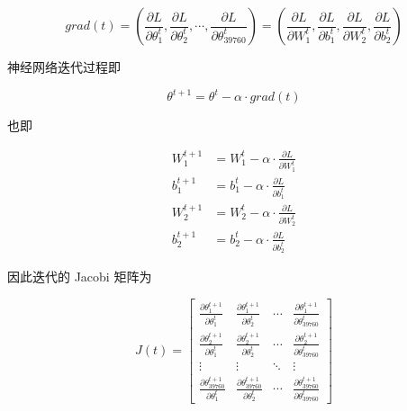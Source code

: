 \documentclass[12pt,a4paper]{amsart}
\begin{document}
\begin{equation}
	grad(t) = (\frac{\partial L}{\partial \theta_1^t}, \frac{\partial L}{\partial \theta_2^t}, \cdots, \frac{\partial L}{\partial \theta_{39760}^t}) = (\frac{\partial L}{\partial W_1^t}, \frac{\partial L}{\partial b_1^t}, \frac{\partial L}{\partial W_2^t}, \frac{\partial L}{\partial b_2^t})
\end{equation}


神经网络迭代过程即

\begin{equation}
	\theta^{t+1} = \theta^t - \alpha \cdot grad(t)
\end{equation}

也即

\begin{equation}
	\begin{aligned}
		W_1^{t+1} & = W_1^t - \alpha \cdot \frac{\partial L}{\partial W_1^t} \\
		b_1^{t+1} & = b_1^t - \alpha \cdot \frac{\partial L}{\partial b_1^t} \\
		W_2^{t+1} & = W_2^t - \alpha \cdot \frac{\partial L}{\partial W_2^t} \\
		b_2^{t+1} & = b_2^t - \alpha \cdot \frac{\partial L}{\partial b_2^t}
	\end{aligned}
\end{equation}

因此迭代的 Jacobi 矩阵为

\begin{equation}
	J(t) = \begin{bmatrix}
		\frac{\partial \theta_1^{t+1}}{\partial \theta_1^t} & \frac{\partial \theta_1^{t+1}}{\partial \theta_2^t} & \cdots & \frac{\partial \theta_1^{t+1}}{\partial \theta_{39760}^t} \\
		\frac{\partial \theta_2^{t+1}}{\partial \theta_1^t} & \frac{\partial \theta_2^{t+1}}{\partial \theta_2^t} & \cdots & \frac{\partial \theta_2^{t+1}}{\partial \theta_{39760}^t} \\
		\vdots                                              & \vdots                                              & \ddots & \vdots                                              \\
		\frac{\partial \theta_{39760}^{t+1}}{\partial \theta_1^t} & \frac{\partial \theta_{39760}^{t+1}}{\partial \theta_2^t} & \cdots & \frac{\partial \theta_{39760}^{t+1}}{\partial \theta_{39760}^t}
	\end{bmatrix}
\end{equation}
\end{document}
